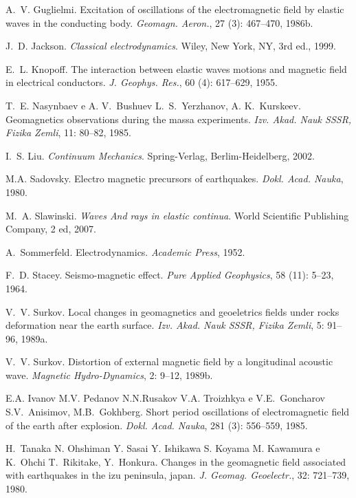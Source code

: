 \documentclass[12pt,a4paper,oneside]{abntex2}
\begin{document}
\begin{thebibliography}{25}
A.~V. Guglielmi.
\newblock Excitation of oscillations of the electromagnetic field by elastic
  waves in the conducting body.
\newblock \emph{Geomagn. Aeron.}, 27 (3): 467--470, 1986b.

J.~D. Jackson.
\newblock \emph{Classical electrodynamics}.
\newblock Wiley, New York, {NY}, 3rd ed., 1999.


E.~L. Knopoff.
\newblock The interaction between elastic waves motions and magnetic field in
  electrical conductors.
\newblock \emph{J. Geophys. Res.}, 60 (4): 617--629, 1955.

T.~E. Nasynbaev e A. V.~Bushuev L.~S.~Yerzhanov, A. K.~Kurskeev.
\newblock Geomagnetics observations during the massa experiments.
\newblock \emph{Izv. Akad. Nauk SSSR, Fizika Zemli}, 11: 80--82, 1985.

I.~S. Liu.
\newblock \emph{Continuum Mechanics}.
\newblock Spring-Verlag, Berlim-Heidelberg, 2002.

M.A. Sadovsky.
\newblock Electro magnetic precursors of earthquakes.
\newblock \emph{Dokl. Acad. Nauka}, 1980.

M.~A. Slawinski.
\newblock \emph{Waves And rays in elastic continua}.
\newblock World Scientific Publishing Company, 2 ed, 2007.


A.~Sommerfeld.
\newblock Electrodynamics.
\newblock \emph{Academic Press}, 1952.

F.~D. Stacey.
\newblock Seismo-magnetic effect.
\newblock \emph{Pure Applied Geophysics}, 58 (11): 5--23,
  1964.

V.~V. Surkov.
\newblock Local changes in geomagnetics and geoeletrics fields under rocks
  deformation near the earth surface.
\newblock \emph{Izv. Akad. Nauk SSSR, Fizika Zemli}, 5: 91--96, 1989a.

V.~V. Surkov.
\newblock Distortion of external magnetic field by a longitudinal acoustic
  wave.
\newblock \emph{Magnetic Hydro-Dynamics}, 2: 9--12, 1989b.

E.A. Ivanov M.V. Pedanov N.N.Rusakov V.A. Troizhkya e V.E.~Goncharov
  S.V.~Anisimov, M.B.~Gokhberg.
\newblock Short period oscillations of electromagnetic field of the earth after
  explosion.
\newblock \emph{Dokl. Acad. Nauka}, 281 (3): 556--559, 1985.

H.~Tanaka N. Ohshiman Y. Sasai Y. Ishikawa S. Koyama M. Kawamura e K.~Ohchi
  T.~Rikitake, Y.~Honkura.
\newblock Changes in the geomagnetic field associated with earthquakes in the
  izu peninsula, japan.
\newblock \emph{J. Geomag. Geoelectr.}, 32: 721--739, 1980.

\end{thebibliography}
\end{document}

